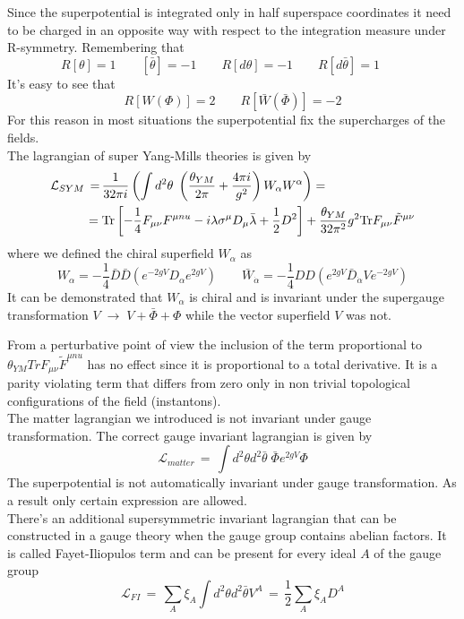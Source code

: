 \begin{appendices}
Since the superpotential is integrated only in half superspace coordinates it need to be charged in an opposite way with respect to the integration measure under R-symmetry.
Remembering  that
\begin{equation}
R[\theta] = 1 \qquad [\bar{\theta}] = - 1 \qquad R[d\theta] = -1 \qquad R [d \bar{\theta}] = 1 \qquad
\end{equation}
It's easy to see that 
\begin{equation}
R[W(\Phi)] = 2 \qquad R[\bar{W}(\bar{\Phi})] = -2
\end{equation}
For this reason in most situations the superpotential fix the supercharges of the fields.
\\
The lagrangian of super Yang-Mills theories is given by
\begin{align}
\mathcal{L}_{SYM} \, = \, & \frac{1}{32 \pi i  } \left( \int d^2 \theta \; \left( \frac{\theta_{YM}}{2 \pi}   + \frac{4 \pi i}{g^2} \right) W_{\alpha} W^{\alpha} \right) 
= 
\\
= \; & \hbox{Tr} \left[ -\frac{1}{4} F_{ \mu \nu} F^{\mu nu } - i \lambda \sigma^{\mu} D_{\mu} \bar{\lambda}  + \frac{1}{2} D^2 \right] + \frac{\theta_{YM}}{32 \pi^2 }g^2 \hbox{Tr} F_{ \mu \nu} \tilde{F}^{\mu \nu } 
\end{align}
where we defined the chiral superfield $W_{\alpha}$ as
\begin{equation}
 W_{\alpha} = - \frac{1}{4} \bar{D} \bar{D}\left(e^{-2 g V}  D_{\alpha}  e^{2g V} \right) \qquad  
\bar{W}_{\dot{\alpha}} = - \frac{1}{4} D D \left(   e^{2gV} \bar{D}_{\dot{\alpha}} V e^{-2gV} \right)  
\end{equation}
It can be demonstrated that $W_{\alpha}$ is chiral and is invariant under the supergauge transformation $V \; \rightarrow \; V + \bar{\Phi} + \Phi$ while the vector superfield $V$ was not.

From a perturbative point of view the inclusion of the term proportional to $\theta_{YM} {Tr} F_{ \mu \nu} \tilde{F}^{\mu nu }  $ has no effect since it is proportional to a total derivative. 
It is a parity violating term that differs from zero only in non trivial topological configurations of the field (instantons).
\\
The matter lagrangian we introduced is not invariant under gauge transformation.
The correct gauge invariant lagrangian is given by
\begin{equation}
 \mathcal{L}_{matter} \, = \, \int d^2 \theta d^2 \bar{\theta} \; \bar{\Phi} e^{ 2 g V} \Phi 
\end{equation}
The superpotential is not automatically invariant under gauge transformation. As a result only certain expression are allowed.
\\
There's an additional supersymmetric invariant lagrangian that can be constructed in a gauge theory when the gauge group contains abelian factors. 
It is called Fayet-Iliopulos term and can be present for every ideal $A$ of the gauge group
\begin{equation}
 \mathcal{L}_{FI} \, = \, \sum_{A} \xi_A \int d^2 \theta d^2 \bar{\theta} V^{A} \, = \, \frac{1}{2} \sum_{A} \xi_A D^A
 \end{equation}


\end{appendices}
